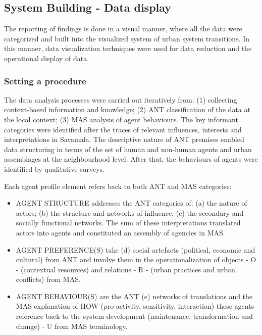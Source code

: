 \documentclass[11pt]{report}
\begin{document}
{{{{\subsection{System Building - Data display}

The reporting of findings is done in a visual manner, where all the data were categorized and built into the visualized system of urban system transitions. In this manner, data visualization techniques were used for data reduction and the operational display of data.

\subsubsection{Setting a procedure}

The data analysis processes were carried out iteratively from: (1) collecting context-based information and knowledge; (2) ANT classification of the data at the local context; (3) MAS analysis of agent behaviours. The key informant categories were identified after the traces of relevant influences, interests and interpretations in Savamala. The descriptive nature of ANT premises enabled data structuring in terms of the set of human and non-human agents and urban assemblages at the neighbourhood level. After that, the behaviours of agents were identified by qualitative surveys.

Each agent profile element refers back to both ANT and MAS categories:

\begin{itemize}
\item AGENT STRUCTURE addresses the ANT categories of: (a) the nature of actors; (b) the structure and networks of influence; (c) the secondary and socially functional networks. The sum of these interpretations translated actors into agents and constituted an assembly of agencies in MAS. 
\item AGENT PREFERENCE(S) take (d) social artefacts (political, economic and cultural) from ANT and involve them in the operationalization of objects - O - (contextual resources) and relations - R - (urban practices and urban conflicts) from MAS.
\item AGENT BEHAVIOUR(S) are the ANT (e) networks of translations and the MAS explanation of HOW (pro-activity, sensitivity, interaction) these agents reference back to the system development (maintenance, transformation and change) - U from MAS terminology.
\end{itemize}

}}}}
\end{document}
